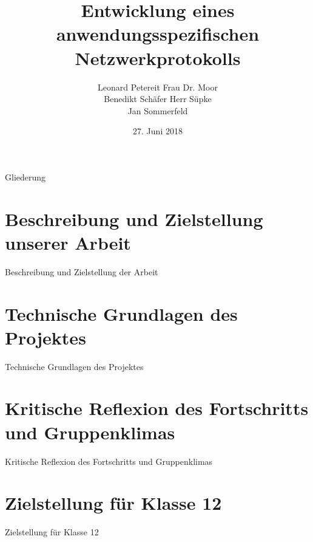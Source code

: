 \documentclass{beamer}
\title[]{Entwicklung eines anwendungsspezifischen Netzwerkprotokolls}
\author{Leonard Petereit\hfill \hspace{0.5cm} Frau Dr. Moor\\ Benedikt Schäfer\hfill \hspace{1cm} Herr Süpke \\ Jan Sommerfeld \hspace{4.25cm} }
\institute{Albert-Schweitzer Gymnasium Erfurt - Spezialschulteil}
\date{27. Juni 2018}
\begin{document}
\begin{frame}
	
  \titlepage
\end{frame}

\begin{frame}{Gliederung}

  \tableofcontents
\end{frame}



\section{Beschreibung und Zielstellung unserer Arbeit}

\begin{frame}{Beschreibung und Zielstellung der Arbeit}

\end{frame}

\section{Technische Grundlagen des Projektes}

\begin{frame}{Technische Grundlagen des Projektes}

\end{frame}

\section{Kritische Reflexion des Fortschritts und Gruppenklimas}

\begin{frame}{Kritische Reflexion des Fortschritts und Gruppenklimas}

\end{frame}

\section{Zielstellung für Klasse 12}

\begin{frame}{Zielstellung für Klasse 12}

\end{frame}
\end{document}
